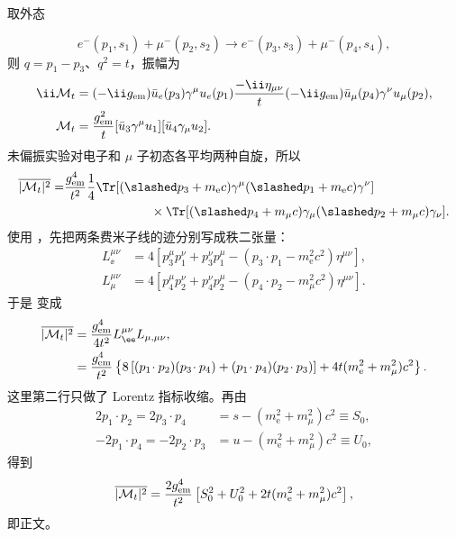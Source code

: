 \begin{derivation}[电子与缪子的散射振幅平方]
取外态

\begin{equation*}
 e^-(p_1,s_1)+\mu^-(p_2,s_2)
 \to e^-(p_3,s_3)+\mu^-(p_4,s_4),
\end{equation*}
则 $q=p_1-p_3$、$q^2=t$，振幅为
\begin{align*}
 \ii\mathcal M_t
 &=(-\ii g_{\rm em})\bar u_e(p_3)\gamma^\mu u_e(p_1)
 \frac{-\ii\eta_{\mu\nu}}{t}
 (-\ii g_{\rm em})\bar u_\mu(p_4)\gamma^\nu u_\mu(p_2),\\
 \mathcal M_t
 &=\frac{g_{\rm em}^2}{t}
 [\bar u_3\gamma^\mu u_1]
 [\bar u_4\gamma_\mu u_2].
 \end{align*}
未偏振实验对电子和 $\mu$ 子初态各平均两种自旋，所以
\begin{align*}
 \overline{|\mathcal M_t|^2}
 =&\frac{g_{\rm em}^4}{t^2}\frac14
 \Tr[(\slashed p_3+m_{\mathrm e} c)\gamma^\mu(\slashed p_1+m_{\mathrm e} c)\gamma^\nu]\nonumber\\
 &\hspace{2.4cm}\times
 \Tr[(\slashed p_4+m_\mu c)\gamma_\mu(\slashed p_2+m_\mu c)\gamma_\nu].
 \end{align*}
使用 ，先把两条费米子线的迹分别写成秩二张量：
\begin{align*}
 L_\ee^{\mu\nu}
 &=4\left[
 p_3^\mu p_1^\nu+p_3^\nu p_1^\mu
 -(p_3\!\cdot p_1-m_{\mathrm e}^2c^2)\eta^{\mu\nu}
 \right],\\
 L_\mu^{\mu\nu}
 &=4\left[
 p_4^\mu p_2^\nu+p_4^\nu p_2^\mu
 -(p_4\!\cdot p_2-m_\mu^2c^2)\eta^{\mu\nu}
 \right].
 \end{align*}
于是  变成
\begin{align*}
 \overline{|\mathcal M_t|^2}
 &=\frac{g_{\rm em}^4}{4t^2}L_\ee^{\mu\nu}L_{\mu,\mu\nu},\\
 &=\frac{g_{\rm em}^4}{t^2}\left\{
 8\left[(p_1\!\cdot p_2)(p_3\!\cdot p_4)
 +(p_1\!\cdot p_4)(p_2\!\cdot p_3)\right]
 +4t(m_{\mathrm e}^2+m_\mu^2)c^2
 \right\}.
 \end{align*}
这里第二行只做了 Lorentz 指标收缩。再由
\begin{align*}
 2p_1\!\cdot p_2=2p_3\!\cdot p_4
 &=s-(m_{\mathrm e}^2+m_\mu^2)c^2\equiv S_0,\\
 -2p_1\!\cdot p_4=-2p_2\!\cdot p_3
 &=u-(m_{\mathrm e}^2+m_\mu^2)c^2\equiv U_0,
\end{align*}
得到
\begin{align*}
 \overline{|\mathcal M_t|^2}
 =\frac{2g_{\rm em}^4}{t^2}
 \left[
 S_0^2+U_0^2+2t(m_{\mathrm e}^2+m_\mu^2)c^2
 \right],
\end{align*}
即正文。


\end{derivation}

